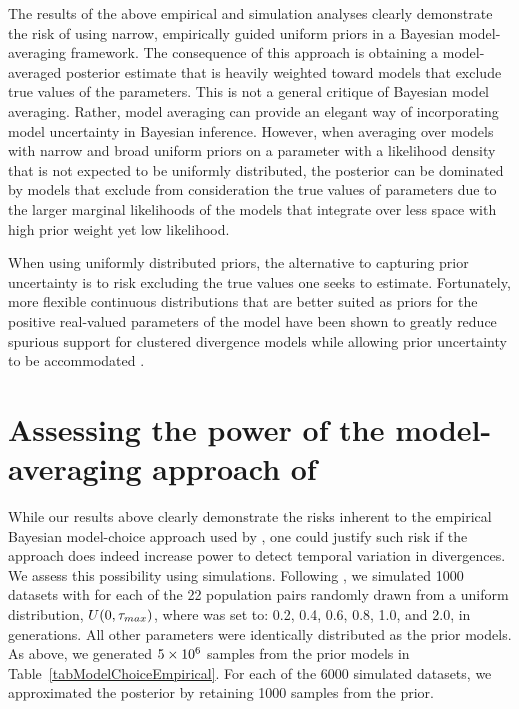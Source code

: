 The results of the above empirical and simulation analyses clearly demonstrate
the risk of using narrow, empirically guided uniform priors in a Bayesian
model-averaging framework.
The consequence of this approach is obtaining a model-averaged posterior
estimate that is heavily weighted toward models that exclude true
values of the parameters.
This is not a general critique of Bayesian model averaging.
Rather, model averaging can provide an elegant way of incorporating
model uncertainty in Bayesian inference.
However, when averaging over models with narrow and broad uniform priors on a
parameter with a likelihood density that is not expected to be uniformly
distributed, the posterior can be dominated by models that exclude from
consideration the true values of parameters due to the larger marginal
likelihoods of the models that integrate over less space with high prior
weight yet low likelihood.

When using uniformly distributed priors, the alternative to capturing prior
uncertainty is to risk excluding the true values one seeks to estimate.
Fortunately, more flexible continuous distributions that are better suited as
priors for the positive real-valued parameters of the \msb model have been
shown to greatly reduce spurious support for clustered divergence models while
allowing prior uncertainty to be accommodated
\citep{Oaks2014dpp}.


\section{Assessing the power of the model-averaging approach of
    \citet{Hickerson2013}}
While our results above clearly demonstrate the risks inherent to the empirical
Bayesian model-choice approach used by \citet{Hickerson2013}, one could justify
such risk if the approach does indeed increase power to detect temporal
variation in divergences.
We assess this possibility using simulations.
Following \citet{Oaks2012}, we simulated 1000 datasets with \divt{} for each of
the 22 population pairs randomly drawn from a uniform distribution, $U(0,
\tau_{max})$, where  was set to: 0.2, 0.4, 0.6, 0.8, 1.0, and 2.0, in
\globalcoalunit generations.
All other parameters were identically distributed as the prior models.
As above, we generated $5\times 10^{6}$ samples from the prior models in
Table~\ref{tabModelChoiceEmpirical}.
For each of the 6000 simulated datasets, we approximated the posterior
by retaining 1000 samples from the prior.

